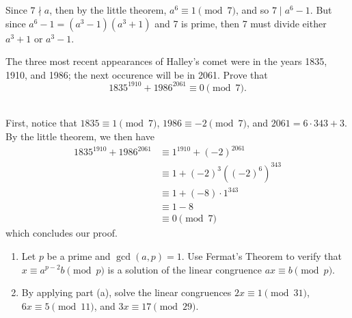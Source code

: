 \begin{solution}
    Since $7 \nmid a$, then by the little theorem, $a^6 \equiv 1 \pmod 7$, and so $7 \mid a^6 - 1$. But since $a^6 - 1 = (a^3 - 1)(a^3 + 1)$ and 7 is prime, then 7 must divide either $a^3 + 1$ or $a^3 - 1$. \\
\end{solution}

\begin{exercise}
    The three most recent appearances of Halley's comet were in the years 1835, 1910, and 1986; the next occurence will be in 2061. Prove that
    $$1835^{1910} + 1986^{2061} \equiv 0 \pmod 7.$$ \\
\end{exercise}

\begin{solution}
    First, notice that $1835 \equiv 1 \pmod 7$, $1986 \equiv -2 \pmod 7$, and $2061 = 6 \cdot 343 + 3$. By the little theorem, we then have
    \begin{align*}
        1835^{1910} + 1986^{2061} &\equiv 1^{1910} + (-2)^{2061} \\
        &\equiv 1 + (-2)^3((-2)^6)^{343} \\
        &\equiv 1 + (-8)\cdot 1^{343} \\
        &\equiv 1 - 8 \\
        &\equiv 0 \pmod 7
    \end{align*}
    which concludes our proof. \\
\end{solution}

\begin{exercise}
    \begin{enumerate}
        \item Let $p$ be a prime and $\gcd(a,p) = 1$. Use Fermat's Theorem to verify that $x \equiv a^{p-2}b \pmod p$ is a solution of the linear congruence $ax \equiv b \pmod p$.
        \item By applying part (a), solve the linear congruences $2x \equiv 1 \pmod{31}$, $6x \equiv 5 \pmod{11}$, and $3x \equiv 17 \pmod{29}$.
    \end{enumerate}
\end{exercise}

